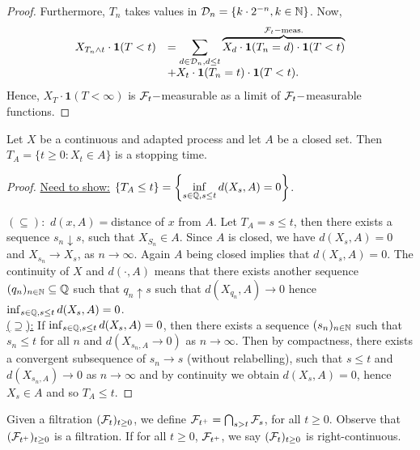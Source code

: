 \documentclass{article}
\begin{document}
\begin{proof}
Furthermore, $ T_{n}$ takes values in $ \mathcal{D}_{n}= \{k\cdot 2^{-n}, k\in \mathbb{N}\}$. Now, 
\[
\begin{array}{ll}
	X_{T_{n}\land t}\cdot \mathbf{1}(T<t) &=\displaystyle\sum_{d\in \mathcal{D}_{n}, d\leq t} \overbrace{X_{d}\cdot \mathbf{1}(T_{n} = d)\cdot \mathbf{1}(T<t)}^{\mathcal{F}_{t}-\text{meas.}} \\
     &+ X_{t}\cdot \mathbf{1}(T_{n}=t)\cdot \mathbf{1}(T<t).
\end{array}
\]
Hence, $ X_{T}\cdot \mathbf{1}(T<\infty)$ is $ \mathcal{F}_{t}-$measurable as a limit of $ \mathcal{F}_{t}-$measurable functions.


\end{proof}


\begin{boxprop}\label{prop: stopping time cont process}
	Let $ X$ be a continuous and adapted process and let $ A$ be a closed set. Then $ T_{A} = \{t\geq 0: X_{t}\in A\}$ is a stopping time.
\end{boxprop}


\begin{proof}
	\underline{Need to show:} $ \{T_{A}\leq t\} = \left\{ \displaystyle\inf_{s\in \mathbb{Q}, s\leq t} d(X_{s}, A) = 0 \right\}$.

	\underline{$ (\subseteq ):$} $ d(x,A)=$distance of $ x$ from $ A$. Let $ T_{A} = s\leq t$, then there exists a sequence $ s_{n}\downarrow s$, such that $ X_{S_{n}}\in A$. Since $ A$ is closed, we have $ d(X_{s}, A) = 0$ and $ X_{s_{n}}\to X_{s}$, as $ n \to \infty$. Again $ A$ being closed implies that $ d(X_{s}, A) = 0$. The continuity of $ X$ and $ d(\cdot, A)$ means that there exists another sequence $ (q_{n})_{n\in \mathbb{N}}\subseteq \mathbb{Q}$ such that $ q_{n}\uparrow s$ such that $ d(X_{q_{n}}, A)\to 0$ hence $\inf_{s\in \mathbb{Q}, s\leq t} d(X_{s}, A) = 0$. \\ 

	\underline{($\supseteq  $):} If $\inf_{s\in \mathbb{Q}, s\leq t} d(X_{s}, A) = 0$, then there exists a sequence $ (s_{n})_{n\in \mathbb{N}}$ such that $ s_{n}\leq t$ for all $ n$ and $ d(X_{s_{n}, A}\to 0)$ as $ n\to \infty$. Then by compactness, there exists a convergent subsequence of $ s_{n}\to s$ (without relabelling), such that $ s\leq t$ and $ d(X_{s_{n}, A})\to 0$ as $ n\to \infty$ and by continuity we obtain $ d(X_{s}, A) =0$, hence $ X_{s}\in A$ and so $ T_{A}\leq t$.

\end{proof}

\begin{boxdef}\label{def: future sigma algebra}
	Given a filtration $ (\mathcal{F}_{t})_{t\geq 0}$, we define $ \mathcal{F}_{t^{+}}= \bigcap_{s>t} \mathcal{F}_{s}$, for all $ t\geq 0$. Observe that $ (\mathcal{F}_{t^{+}})_{t\geq 0}$ is a filtration. If for all $ t\geq 0$, $ \mathcal{F}_{t^{+}}$, we say $ (\mathcal{F}_{t})_{t\geq 0}$ is right-continuous. 
\end{boxdef}
\end{document}

